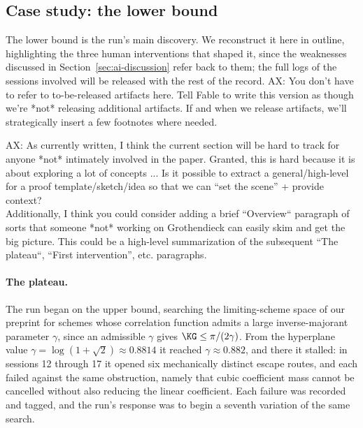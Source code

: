 \subsection{Case study: the lower bound}
\label{sec:ai-case-study}

The lower bound is the run's main discovery. We reconstruct it here in
outline, highlighting the three human interventions that shaped it, since
the weaknesses discussed in Section~\ref{sec:ai-discussion} refer back to
them; the full logs of the sessions involved will be released with the rest
of the record.
{\color{red}AX: You don't have to refer to to-be-released artifacts here.
Tell Fable to write this version as though we're *not* releasing additional artifacts.
If and when we release artifacts, we'll strategically insert a few footnotes where needed.
}

{\color{red}AX: As currently written, I think the current section will be hard to track for anyone *not* intimately involved in the paper.
Granted, this is hard because it is about exploring a lot of concepts ...
Is it possible to extract a general/high-level for a proof template/sketch/idea so that we can ``set the scene'' + provide context?
\\
Additionally, I think you could consider adding a brief ``Overview`` paragraph of sorts that someone *not* working on Grothendieck can easily skim and get the big picture. This could be a high-level summarization of the subsequent ``The plateau``, ``First intervention'', etc. paragraphs.
}

\paragraph{The plateau.}
The run began on the upper bound, searching the limiting-scheme space of our
preprint for schemes whose correlation function admits a large
inverse-majorant parameter $\gamma$, since an admissible $\gamma$ gives
$\KG\le\pi/(2\gamma)$. From the hyperplane value
$\gamma=\log(1+\sqrt2)\approx0.8814$ it reached $\gamma\approx0.882$, and
there it stalled: in sessions 12 through 17 it opened six {\color{red}mechanically
distinct escape routes}, and each failed against the same obstruction,
namely that cubic coefficient mass cannot be cancelled without also reducing
the linear coefficient. Each failure was recorded and tagged, and the run's
response was to begin a seventh variation of the same search.

